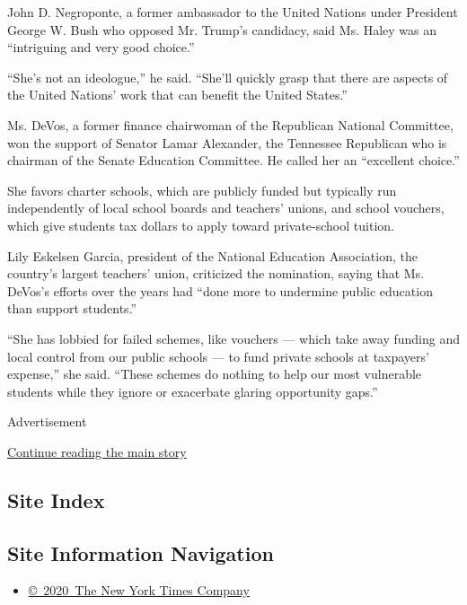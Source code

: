 John D. Negroponte, a former ambassador to the United Nations under
President George W. Bush who opposed Mr. Trump's candidacy, said Ms.
Haley was an ``intriguing and very good choice.''

``She's not an ideologue,'' he said. ``She'll quickly grasp that there
are aspects of the United Nations' work that can benefit the United
States.''

Ms. DeVos, a former finance chairwoman of the Republican National
Committee, won the support of Senator Lamar Alexander, the Tennessee
Republican who is chairman of the Senate Education Committee. He called
her an ``excellent choice.''

She favors charter schools, which are publicly funded but typically run
independently of local school boards and teachers' unions, and school
vouchers, which give students tax dollars to apply toward private-school
tuition.

Lily Eskelsen Garcia, president of the National Education Association,
the country's largest teachers' union, criticized the nomination, saying
that Ms. DeVos's efforts over the years had ``done more to undermine
public education than support students.''

``She has lobbied for failed schemes, like vouchers --- which take away
funding and local control from our public schools --- to fund private
schools at taxpayers' expense,'' she said. ``These schemes do nothing to
help our most vulnerable students while they ignore or exacerbate
glaring opportunity gaps.''

Advertisement

\protect\hyperlink{after-bottom}{Continue reading the main story}

\hypertarget{site-index}{%
\subsection{Site Index}\label{site-index}}

\hypertarget{site-information-navigation}{%
\subsection{Site Information
Navigation}\label{site-information-navigation}}

\begin{itemize}
\tightlist
\item
  \href{https://help.nytimes.com/hc/en-us/articles/115014792127-Copyright-notice}{©~2020~The
  New York Times Company}
\end{itemize}

